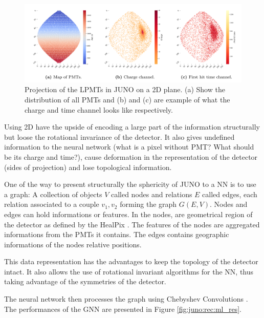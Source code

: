 \documentclass[../main.tex]{subfiles}
\begin{document}
\begin{figure}[ht]
  \centering
  \includegraphics[width=\linewidth]{images/juno/reco/cnn_proj.png}
  \caption{Projection of the LPMTs in JUNO on a 2D plane. (a) Show the distribution of all PMTs and (b) and (c) are example of what the charge and time channel looks like respectively.}
  \label{fig:juno:rec:cnn_proj}
\end{figure}

Using 2D have the upside of encoding a large part of the information structurally but loose the rotational invariance of the detector. It also gives undefined information to the neural network (what is a pixel without PMT? What should be its charge and time?), cause deformation in the representation of the detector (sides of projection) and lose topological information.

One of the way to present structurally the sphericity of JUNO to a NN is to use a graph: A collection of objects $V$ called nodes and relations $E$ called edges, each relation associated to a couple ${v_1, v_2}$ forming the graph $G(E, V)$. Nodes and edges can hold informations or features. In \cite{qian_vertex_2021} the nodes, are geometrical region of the detector as defined by the HealPix \cite{gorski_healpix_2005-1}. The features of the nodes are aggregated informations from the PMTs it contains. The edges contains geographic informations of the nodes relative positions.

This data representation has the advantages to keep the topology of the detector intact. It also allows the use of rotational invariant algorithms for the NN, thus taking advantage of the symmetries of the detector.

The neural network then processes the graph using Chebyshev Convolutions \cite{defferrard_convolutional_2017}. The performances of the GNN are presented in Figure \ref{fig:juno:rec:ml_res}.
\end{document}
